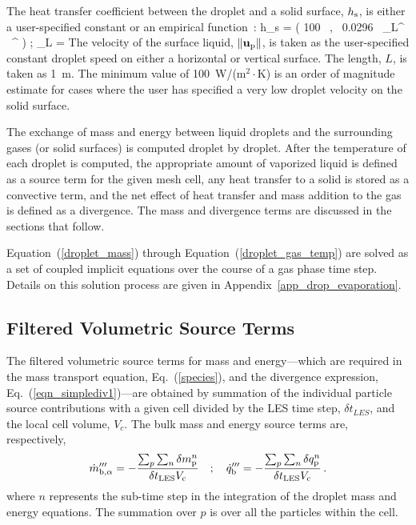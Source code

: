 The heat transfer coefficient between the droplet and a solid surface, $h_{\rm s}$, is either a user-specified constant or an empirical function~\cite{Incropera:1}:
\be
   h_{\rm s} = \max \left( 100 \, , \, 0.0296 \, \RE_L^{} \, \PR^\ot \;  \right)  \quad ; \quad \RE_L = 
\ee
The velocity of the surface liquid, $\| {\mathbf{u}}_{\rm p} \|$, is taken as the user-specified constant droplet speed on either a horizontal or vertical surface. The length, $L$, is taken as 1~m. The minimum value of 100~W/(m$^2 \cdot$K) is an order of magnitude estimate for cases where the user has specified a very low droplet velocity on the solid surface.

The exchange of mass and energy between liquid droplets and the surrounding gases (or solid surfaces) is computed droplet by droplet. After the temperature of each droplet is computed, the
appropriate amount of vaporized liquid is defined as a source term for the given mesh cell, any heat transfer to a solid is stored as a convective term, and the net effect of heat transfer and mass addition to the gas is defined as a divergence. The mass and divergence terms are discussed in the sections that follow.

Equation~(\ref{droplet_mass}) through Equation~(\ref{droplet_gas_temp}) are solved as a set of coupled implicit equations over the course of a gas phase time step. Details on this solution process are given in Appendix~\ref{app_drop_evaporation}.

\subsection{Filtered Volumetric Source Terms}

The filtered volumetric source terms for mass and energy---which are required in the mass transport equation, Eq.~(\ref{species}), and the divergence expression, Eq.~(\ref{eqn_simplediv1})---are obtained by summation of the individual particle source contributions with a given cell divided by the LES time step, $\delta t_{\unit{LES}}$, and the local cell volume, $V_{\unit{c}}$. The bulk mass and energy source terms are, respectively,
\begin{equation}
\label{eq:bulk_source}
\dot{m}_{{\rm b},\alpha}^{\ppp} = - \frac{ \sum_p \sum_n \delta m_{\unit{p}}^n }{\delta t_{\unit{LES}} V_{\unit{c}}} \quad ; \quad
\dot{q}_{\rm b}^{\ppp} = - \frac{ \sum_p \sum_n \delta q_{\unit{p}}^n }{\delta t_{\unit{LES}} V_{\unit{c}}} \,\mbox{.}
\end{equation}
where $n$ represents the sub-time step in the integration of the droplet mass and energy equations.  The summation over $p$ is over all the particles within the cell.

